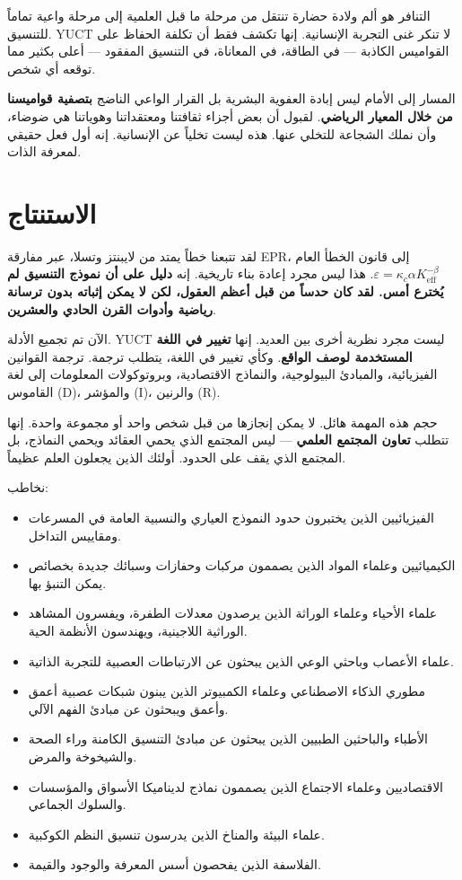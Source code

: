 \documentclass[12pt,a4paper]{article}
\begin{document}
	التنافر هو ألم ولادة حضارة تنتقل من مرحلة ما قبل العلمية إلى مرحلة واعية تماماً للتنسيق. YUCT لا تنكر غنى التجربة الإنسانية. إنها تكشف فقط أن تكلفة الحفاظ على القواميس الكاذبة — في الطاقة، في المعاناة، في التنسيق المفقود — أعلى بكثير مما توقعه أي شخص.
	
	المسار إلى الأمام ليس إبادة العفوية البشرية بل القرار الواعي الناضج \textbf{بتصفية قواميسنا من خلال المعيار الرياضي}. لقبول أن بعض أجزاء ثقافتنا ومعتقداتنا وهوياتنا هي ضوضاء، وأن نملك الشجاعة للتخلي عنها. هذه ليست تخلياً عن الإنسانية. إنه أول فعل حقيقي لمعرفة الذات.
	
	\section{الاستنتاج}
	
	لقد تتبعنا خطاً يمتد من لايبنتز وتسلا، عبر مفارقة EPR، إلى قانون الخطأ العام \(\varepsilon = \kappa_c \alpha K_{\mathrm{eff}}^{-\beta}\). هذا ليس مجرد إعادة بناء تاريخية. إنه \textbf{دليل على أن نموذج التنسيق لم يُخترع أمس. لقد كان حدساً من قبل أعظم العقول، لكن لا يمكن إثباته بدون ترسانة رياضية وأدوات القرن الحادي والعشرين}.
	
	الآن تم تجميع الأدلة. YUCT ليست مجرد نظرية أخرى بين العديد. إنها \textbf{تغيير في اللغة المستخدمة لوصف الواقع}. وكأي تغيير في اللغة، يتطلب ترجمة. ترجمة القوانين الفيزيائية، والمبادئ البيولوجية، والنماذج الاقتصادية، وبروتوكولات المعلومات إلى لغة القاموس (D)، والمؤشر (I)، والرنين (R).
	
	حجم هذه المهمة هائل. لا يمكن إنجازها من قبل شخص واحد أو مجموعة واحدة. إنها تتطلب \textbf{تعاون المجتمع العلمي} — ليس المجتمع الذي يحمي العقائد ويحمي النماذج، بل المجتمع الذي يقف على الحدود. أولئك الذين يجعلون العلم عظيماً.
	
	نخاطب:
	\begin{itemize}
		\item الفيزيائيين الذين يختبرون حدود النموذج العياري والنسبية العامة في المسرعات ومقاييس التداخل.
		\item الكيميائيين وعلماء المواد الذين يصممون مركبات وحفازات وسبائك جديدة بخصائص يمكن التنبؤ بها.
		\item علماء الأحياء وعلماء الوراثة الذين يرصدون معدلات الطفرة، ويفسرون المشاهد الوراثية اللاجينية، ويهندسون الأنظمة الحية.
		\item علماء الأعصاب وباحثي الوعي الذين يبحثون عن الارتباطات العصبية للتجربة الذاتية.
		\item مطوري الذكاء الاصطناعي وعلماء الكمبيوتر الذين يبنون شبكات عصبية أعمق وأعمق ويبحثون عن مبادئ الفهم الآلي.
		\item الأطباء والباحثين الطبيين الذين يبحثون عن مبادئ التنسيق الكامنة وراء الصحة والشيخوخة والمرض.
		\item الاقتصاديين وعلماء الاجتماع الذين يصممون نماذج لديناميكا الأسواق والمؤسسات والسلوك الجماعي.
		\item علماء البيئة والمناخ الذين يدرسون تنسيق النظم الكوكبية.
		\item الفلاسفة الذين يفحصون أسس المعرفة والوجود والقيمة.
	\end{itemize}
	
\end{document}
